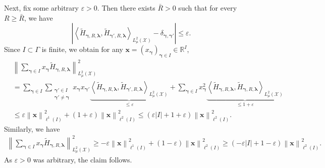 \documentclass[namedate,webpdf]{ima-authoring-template-blank}
\newcommand*{\nm}[1]{{\left\|#1\right \|}}
\newcommand{\abs}[1]{\left|#1\right|}
\newcommand*{\ip}[2]{\left\langle #1, #2 \right\rangle}
\numberwithin{counter}{section}
\numberwithin{equation}{section}
\theoremstyle{plain}
\theoremstyle{definition}
\newcommand*{\cX}{\mathcal{X}}
\newcommand*{\bbR}{\mathbb{R}}
\newcommand*{\wtH}{\widetilde{H}}
\theoremstyle{thmstyletwo}
\begin{document}
Next, fix some arbitrary \(\varepsilon > 0\). Then there exists \(\bar{R} > 0\) such that for every \(R \geq \bar{R}\), we have 
\[
\abs{\ip{\wtH_{\bm{\gamma}, R, \bm{\lambda}}}{\wtH_{\bm{\gamma'}, R, \bm{\lambda}}}_{L_{\mu}^2(\cX)} - \delta_{\bm{\gamma}, \bm{\gamma'}}} \leq \varepsilon.
\]
Since \(I \subset \Gamma\) is finite, we obtain for any \(\bm{x} = (x_{\bm{\gamma}})_{\bm{\gamma} \in I} \in \bbR^I\),
\begin{align*}
    &\nm{\sum_{\bm{\gamma} \in I} x_{\bm{\gamma}} \wtH_{\bm{\gamma}, R,  \bm{\lambda}}}_{L_{\mu}^2(\cX)}^2 \\
    &= \sum_{\bm{\gamma} \in I} \sum_{\substack{\bm{\gamma'} \in I \\ \bm{\gamma'} \neq \bm{\gamma}}} x_{\bm{\gamma}} x_{\bm{\gamma'}} \underbrace{\ip{\wtH_{\bm{\gamma}, R, \bm{\lambda}}}{\wtH_{\bm{\gamma'}, R, \bm{\lambda}}}_{L_{\mu}^2(\cX)}}_{\leq\varepsilon}
    + \sum_{\bm{\gamma} \in I} x_{\bm{\gamma}}^2 \underbrace{\ip{\wtH_{\bm{\gamma}, R, \bm{\lambda}}}{\wtH_{\bm{\gamma}, R, \bm{\lambda}}}_{L_{\mu}^2(\cX)}}_{\leq 1 + \varepsilon} \\
    &\leq \varepsilon \nm{\bm{x}}_{\ell^1(I)}^2 + (1+\varepsilon) \nm{\bm{x}}_{\ell^2(I)}^2 \leq (\varepsilon \abs{I} + 1+ \varepsilon) \nm{\bm{x}}_{\ell^2(I)}^2.
\end{align*}
Similarly, we have
\begin{align*}
    \nm{\sum_{\bm{\gamma} \in I} x_{\bm{\gamma}} \wtH_{\bm{\gamma}, R, \bm{\lambda}}}_{L_{\mu}^2(\cX)}^2 
    \geq -\varepsilon \nm{\bm{x}}_{\ell^1(I)}^2 + (1-\varepsilon) \nm{\bm{x}}_{\ell^2(I)}^2 
    \geq (-\varepsilon \abs{I} + 1 - \varepsilon) \nm{\bm{x}}_{\ell^2(I)}^2.
\end{align*}
As \(\varepsilon > 0\) was arbitrary, the claim follows. \hfill \qedsymbol{}
\end{document}
